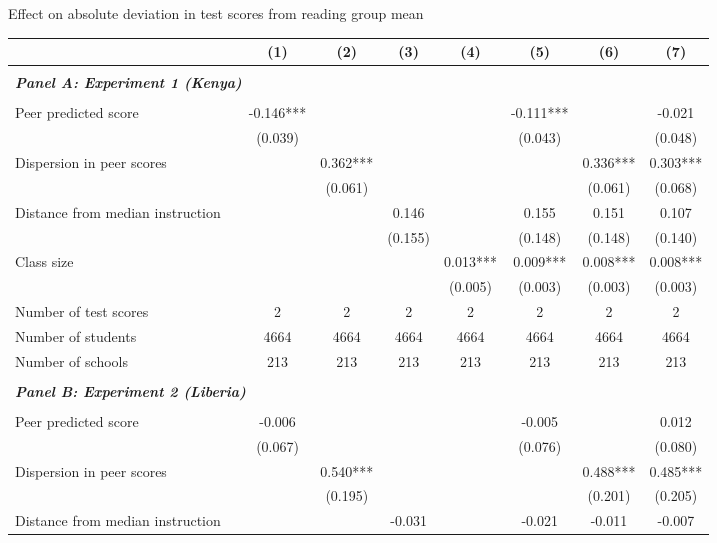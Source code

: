 \begin{center} 
\caption{\small Effect on absolute deviation in test scores from reading group mean} 
\label{tab:descriptives} 
\begin{scriptsize}
\begin{threeparttable}
\begin{tabular} {@{} l l c c c c c c c  @{}} \toprule \toprule
& &(1)&(2)&(3)&(4)&(5)&(6)&(7) \\ \midrule 
\\
\multicolumn{3}{l}{\textbf{\textit{Panel A: Experiment 1 (Kenya)}}} \\
\\
Peer predicted score &  & -0.146*** &  &  &  & -0.111*** &  & -0.021 \\
                 &  & (0.039) &  &  &  & (0.043) &  & (0.048) \\
Dispersion in peer scores &  &  & 0.362*** &  &  &  & 0.336*** & 0.303*** \\
                 &  &  & (0.061) &  &  &  & (0.061) & (0.068) \\
Distance from median instruction &  &  &  & 0.146 &  & 0.155 & 0.151 & 0.107 \\
                 &  &  &  & (0.155) &  & (0.148) & (0.148) & (0.140) \\
Class size &  &  &  &  & 0.013*** & 0.009*** & 0.008*** & 0.008*** \\
                 &  &  &  &  & (0.005) & (0.003) & (0.003) & (0.003) \\
\midrule
Number of test scores &  & 2 & 2 & 2 & 2 & 2 & 2 & 2 \\
Number of students &  & 4664 & 4664 & 4664 & 4664 & 4664 & 4664 & 4664 \\
Number of schools &  & 213 & 213 & 213 & 213 & 213 & 213 & 213 \\
 \midrule
\\
\multicolumn{3}{l}{\textbf{\textit{Panel B: Experiment 2 (Liberia)}}} \\
\\
Peer predicted score &  & -0.006 &  &  &  & -0.005 &  & 0.012 \\
                 &  & (0.067) &  &  &  & (0.076) &  & (0.080) \\
Dispersion in peer scores &  &  & 0.540*** &  &  &  & 0.488*** & 0.485*** \\
                 &  &  & (0.195) &  &  &  & (0.201) & (0.205) \\
Distance from median instruction &  &  &  & -0.031 &  & -0.021 & -0.011 & -0.007 \\

\end{tabular}
\end{threeparttable}
\end{scriptsize}
\end{center}
